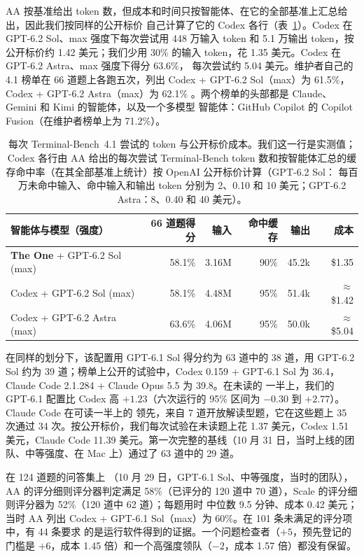 AA 按基准给出 token 数，但成本和时间只按智能体、在它的全部基准上汇总给出，因此我们按同样的公开标价
自己计算了它的 Codex 各行（表~\ref{tab:cost}）。Codex 在 GPT-6.2 Sol、max 强度下每次尝试用 448 万输入 token 和 5.1 万输出
token，按公开标价约 1.42 美元；我们少用 30\% 的输入 token，花 1.35 美元。Codex 在 GPT-6.2 Astra、max 强度下得分 63.6\%，
每次尝试约 5.04 美元。维护者自己的 4.1 榜单在 66 道题上各跑五次，列出 Codex + GPT-6.2 Sol（max）为 61.5\%，Codex +
GPT-6.2 Astra（max）为 62.1\% \citep{tbench2026board}。两个榜单的头部都是 Claude、Gemini 和 Kimi 的智能体，以及一个多模型
智能体：GitHub Copilot 的 Copilot Fusion（在维护者榜单上为 71.2\%）。

\begin{table}[t]
\centering
\small
\caption{每次 Terminal-Bench~4.1 尝试的 token 与公开标价成本。我们这一行是实测值；Codex 各行由 AA 给出的每次尝试
Terminal-Bench token 数和按智能体汇总的缓存命中率（在其全部基准上统计）按 OpenAI 公开标价计算（GPT-6.2 Sol：
每百万未命中输入、命中输入和输出 token 分别为 2、0.10 和 10 美元；GPT-6.2 Astra：8、0.40 和 40 美元）。}
\label{tab:cost}
\begin{tabular}{@{}lrrrrr@{}}
\toprule
智能体与模型（强度） & 66 道题得分 & 输入 & 命中缓存 & 输出 & 成本 \\
\midrule
\textbf{The One} + GPT-6.2 Sol (max) & 58.1\% & 3.16M & 90\% & 45.2k & \$1.35 \\
Codex + GPT-6.2 Sol (max) & 58.1\% & 4.48M & 95\% & 51.4k & $\approx$\$1.42 \\
Codex + GPT-6.2 Astra (max) & 63.6\% & 4.06M & 95\% & 50.0k & $\approx$\$5.04 \\
\bottomrule
\end{tabular}
\end{table}

在同样的划分下，该配置用 GPT-6.1 Sol 得分约为 63 道中的 38 道，用 GPT-6.2 Sol 约为
39 道；榜单上公开的试验中，Codex 0.159 + GPT-6.1 Sol 为 36.4，Claude Code 2.1.284 + Claude Opus 5.5 为 39.8。在未读的
一半上，我们的 GPT-6.1 配置比 Codex 高 $+1.23$（六次运行的 95\% 区间为 $-0.30$ 到 $+2.77$）。Claude Code 在可读一半上的
领先，来自 7 道开放解读型题，它在这些题上 35 次通过 34 次。按公开标价，我们每次试验在未读题上花 1.37 美元，Codex
1.51 美元，Claude Code 11.39 美元。第一次完整的基线（10 月 31 日，当时上线的团队、中等强度、在 Mac 上）通过了 63 道中的
29 道。

在 124 道题的问答集上 \citep{raghavendra2026sweatlas}（10 月 29 日，GPT-6.1 Sol、中等强度，当时的团队），
AA 的评分细则评分器判定满足 58\%（已评分的 120 道中 70 道），Scale 的评分细则评分器为 52\%（120 道中 62 道）；每题用时
中位数 9.5 分钟、成本 0.42 美元；当时 AA 列出 Codex + GPT-6.1 Sol（max）为 60\%。在 101 条未满足的评分项中，有 44 条要求
的是运行软件得到的证据。一个问题检查者（$+5$，预先登记的门槛是 $+6$，成本 1.45 倍）和一个高强度领队（$-2$，成本
1.57 倍）都没有保留。

